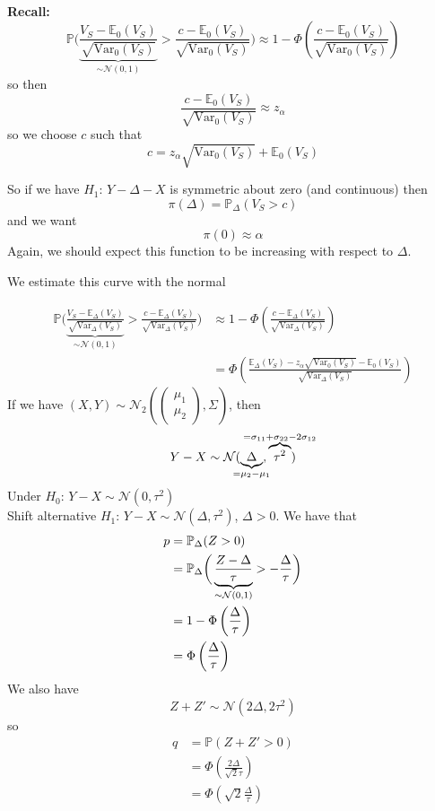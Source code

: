 \documentclass[a4paper,12pt]{amsart}
\newcommand{\Var}{\mbox{Var}}
\newcommand{\p}[1]{\mathbb{P}\left(#1\right)}
\newcommand{\sP}{\mathbb{P}}
\begin{document}
\noindent
\textbf{Recall: }
\[\sP\bigg(\underbrace{\frac{V_S - \mathbb{E}_0(V_S)}{\sqrt{\Var_0(V_S)}}}_{\sim \mathcal{N}(0,1)} > \frac{c - \mathbb{E}_0(V_S)}{\sqrt{\Var_0(V_S)}}\bigg) \approx 1 - \Phi\left(\frac{c-\mathbb{E}_0(V_S)}{\sqrt{\Var_0(V_S)}}\right)\]
so then 
\[\frac{c - \mathbb{E}_0(V_S)}{\sqrt{\Var_0(V_S)}} \approx z_\alpha\]
so we choose $c$ such that
\[c = z_\alpha\sqrt{\Var_0(V_S)} + \mathbb{E}_0(V_S)\]

So if we have $H_1$: $Y - \Delta - X$ is symmetric about zero (and continuous) then
\[\pi(\Delta) = \mathbb{P}_\Delta (V_S>c)\]
and we want 
\[\pi(0) \approx \alpha\]
Again, we should expect this function to be increasing with respect to $\Delta$.

We estimate this curve with the normal 

\begin{align*}
\mathbb{P}\bigg(\underbrace{\frac{V_S - \mathbb{E}_\Delta(V_S)}{\sqrt{\Var_\Delta(V_S)}}}_{\sim \mathcal{N}(0,1)}> \frac{c - \mathbb{E}_\Delta(V_S)}{\sqrt{\Var_\Delta(V_S)}}\bigg) &\approx 1 - \Phi\left(\frac{c-\mathbb{E}_\Delta(V_S)}{\sqrt{\Var_\Delta(V_S)}}\right)\\
&= \Phi\left(\frac{\mathbb{E}_\Delta(V_S) - z_\alpha \sqrt{\Var_0(V_S)} - \mathbb{E}_0(V_S)}{\sqrt{\Var_\Delta(V_S)}}\right)
\end{align*}
If we have $(X,Y) \sim \mathcal{N}_2\left(\begin{pmatrix}
\mu_1\\ \mu_2
\end{pmatrix}, \Sigma\right)$, then
\[Y-X \sim \mathcal{N}(\underbrace{\Delta}_{\mathclap{=\mu_2 - \mu_1}}, \overbrace{\tau^2}^{\mathclap{=\sigma_{11} + \sigma_{22} - 2\sigma_{12}}})\]
Under $H_0$: $Y-X \sim \mathcal{N}(0,\tau^2)$\\
Shift alternative $H_1$: $Y - X \sim \mathcal{N}(\Delta, \tau^2)$, $\Delta >0$.
We have that
\begin{align*}
p &= \mathbb{P}_\Delta (Z>0)\\
&= \mathbb{P}_\Delta \bigg(\underbrace{\frac{Z - \Delta}{\tau}}_{\sim \mathcal{N}(0,1)} > - \frac{\Delta}{\tau}\bigg)\\
&= 1 - \Phi\left(\-\frac{\Delta}{\tau}\right)\\
&= \Phi\left(\frac{\Delta}{\tau}\right)
\end{align*}
We also have
\[Z  + Z' \sim \mathcal{N}(2\Delta, 2 \tau^2)\]
so
\begin{align*}
q &= \p{Z + Z' > 0}\\
&= \Phi\left(\frac{2 \Delta}{\sqrt{2} \tau}\right)\\
&= \Phi\left(\sqrt{2} \frac{\Delta}{\tau}\right)
\end{align*}
\end{document}
